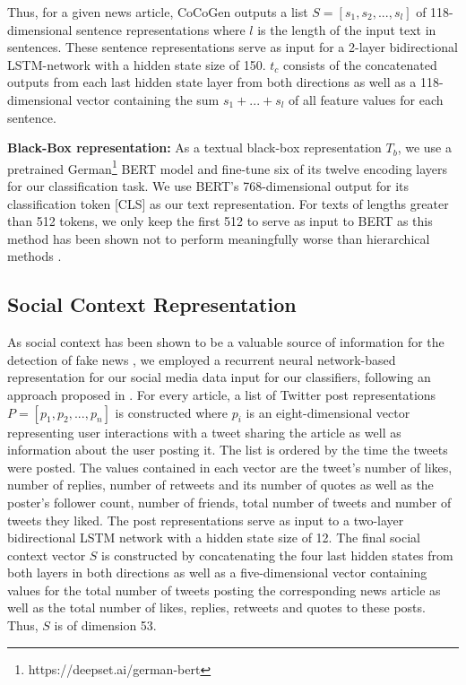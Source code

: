 \documentclass[11pt]{article}
\begin{document}
Thus, for a given news article, CoCoGen outputs a list \(S = [s_1, s_2, ..., s_l]\) of 118-dimensional sentence representations where \(l\) is the length of the input text in sentences. These sentence representations serve as input for a 2-layer bidirectional LSTM-network \citep{graves2005framewise} with a hidden state size of 150. \(t_c\) consists of the concatenated outputs from each last hidden state layer from both directions as well as a 118-dimensional vector containing the sum \(s_1 + ...+ s_l\) of all feature values for each sentence.


\textbf{Black-Box representation:}
As a textual black-box representation \(T_b\), we use a pretrained German\footnote{https://deepset.ai/german-bert} BERT model \citep{devlin-etal-2019-bert} and fine-tune six of its twelve encoding layers for our classification task. We use BERT's 768-dimensional output for its classification token [CLS] as our text representation. For texts of lengths greater than 512 tokens, we only keep the first 512 to serve as input to BERT as this method has been shown not to perform meaningfully worse than hierarchical methods \citep{DBLP:journals/corr/abs-1905-05583}.


\subsection{Social Context Representation}

As social context has been shown to be a valuable source of information for the detection of fake news \citep{kshusocialcontext, fnnetworkapproach}, we employed a recurrent neural network-based representation for our social media data input for our classifiers, following an approach proposed in \citet{10.1145/3132847.3132877}.
For every article, a list of Twitter post representations \(P = [p_1, p_2, ..., p_n]\) is constructed where \(p_i\) is an eight-dimensional vector representing user interactions with a tweet sharing the article as well as information about the user posting it. The list is ordered by the time the tweets were posted. The values contained in each vector are the tweet's number of likes, number of replies, number of retweets and its number of quotes as well as the poster's follower count, number of friends, total number of tweets and number of tweets they liked.
The post representations serve as input to a two-layer bidirectional LSTM network with a hidden state size of 12. The final social context vector \(S\) is constructed by concatenating the four last hidden states from both layers in both directions as well as a five-dimensional vector containing values for the total number of tweets posting the corresponding news article as well as the total number of likes, replies, retweets and quotes to these posts. Thus, \(S\) is of dimension 53.
\end{document}

